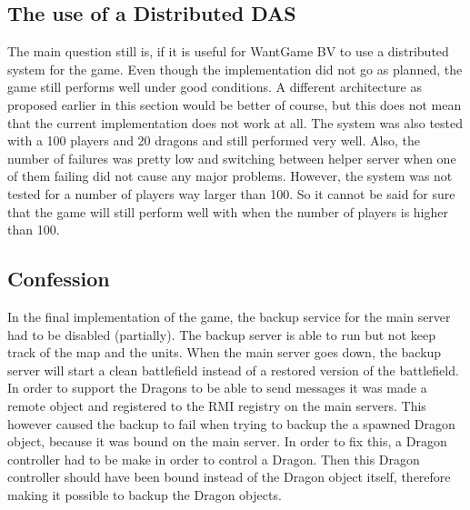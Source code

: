 \subsection{The use of a Distributed DAS}
The main question still is, if it is useful for WantGame BV to use a distributed system for the game.
Even though the implementation did not go as planned, the game still performs well under good conditions.
A different architecture as proposed earlier in this section would be better of course, but this does not mean that the current implementation does not work at all.
The system was also tested with a 100 players and 20 dragons and still performed very well.
Also, the number of failures was pretty low and switching between helper server when one of them failing did not cause any major problems.
However, the system was not tested for a number of players way larger than 100.
So it cannot be said for sure that the game will still perform well with when the number of players is higher than 100.

\subsection{Confession}
In the final implementation of the game, the backup service for the main server had to be disabled (partially).
The backup server is able to run but not keep track of the map and the units. 
When the main server goes down, the backup server will start a clean battlefield instead of a restored version of the battlefield.
In order to support the Dragons to be able to send messages it was made a remote object and registered to the RMI registry on the main servers.
This however caused the backup to fail when trying to backup the a spawned Dragon object, because it was bound on the main server.
In order to fix this, a Dragon controller had to be make in order to control a Dragon. 
Then this Dragon controller should have been bound instead of the Dragon object itself, therefore making it possible to backup the Dragon objects.



